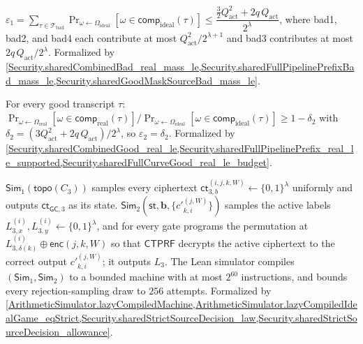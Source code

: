 \begin{paperclaim}\label{babe:claim11}
$\varepsilon_1 = \sum_{\tau \in \mathcal{T}_{\mathrm{bad}}} \Pr_{\omega \gets \Omega_{\mathrm{ideal}}}[\omega \in \mathsf{comp}_{\mathrm{ideal}}(\tau)] \leq \dfrac{\tfrac{3}{2} Q_{\mathrm{act}}^2 + 2 q\, Q_{\mathrm{act}}}{2^{\lambda}}$,
where bad1, bad2, and bad4 each contribute at most $Q_{\mathrm{act}}^2 / 2^{\lambda + 1}$ and bad3 contributes at most $2 q\, Q_{\mathrm{act}} / 2^{\lambda}$.
Formalized by \cref{Security.sharedCombinedBad_real_mass_le,Security.sharedFullPipelinePrefixBad_mass_le,Security.sharedGoodMaskSourceBad_mass_le}.
\end{paperclaim}

\begin{paperclaim}\label{babe:claim12}
For every good transcript $\tau$:
$\Pr_{\omega \gets \Omega_{\mathrm{real}}}[\omega \in \mathsf{comp}_{\mathrm{real}}(\tau)] / \Pr_{\omega \gets \Omega_{\mathrm{ideal}}}[\omega \in \mathsf{comp}_{\mathrm{ideal}}(\tau)] \geq 1 - \delta_2$ with $\delta_2 = (3 Q_{\mathrm{act}}^2 + 2 q\, Q_{\mathrm{act}}) / 2^{\lambda}$, so $\varepsilon_2 = \delta_2$.
Formalized by \cref{Security.sharedCombinedGood_real_le,Security.sharedFullPipelinePrefix_real_le_supported,Security.sharedFullCurveGood_real_le_budget}.
\end{paperclaim}

\begin{paperconstr}\label{babe:con3}
$\mathsf{Sim}_1(\mathsf{topo}(C_3))$ samples every ciphertext $\mathsf{ct}^{(i,j,k,W)}_{3,b} \gets \{0,1\}^{\lambda}$ uniformly and outputs $\mathsf{ct}_{\mathsf{GC},3}$ as its state.
$\mathsf{Sim}_2(\mathsf{st}, \mathbf{b}, \{c'^{(j,W)}_{k,i}\})$ samples the active labels $L^{(i)}_{3,x}, L^{(i)}_{3,y} \gets \{0,1\}^{\lambda}$, and for every gate programs the permutation at $L^{(i)}_{3,\delta(k)} \oplus \mathsf{enc}(j, k, W)$ so that $\mathsf{CTPRF}$ decrypts the active ciphertext to the correct output $c'^{(j,W)}_{k,i}$; it outputs $L_3$.
The Lean simulator compiles $(\mathsf{Sim}_1, \mathsf{Sim}_2)$ to a bounded machine with at most $2^{60}$ instructions, and bounds every rejection-sampling draw to $256$ attempts.
Formalized by \cref{ArithmeticSimulator.lazyCompiledMachine,ArithmeticSimulator.lazyCompiledIdealGame_eqStrict,Security.sharedStrictSourceDecision_law,Security.sharedStrictSourceDecision_allowance}.
\end{paperconstr}

